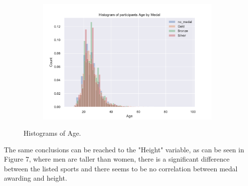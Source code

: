 \documentclass[11pt]{article} %
\begin{document}
\begin{figure}
    \begin{subfigure}{.5\textwidth}
    \includegraphics[scale=0.5]{Age_hist_by_Medal.pdf}
    \end{subfigure}
    \caption{Histograms of Age.}
\end{figure}

The same conclusions can be reached to the "Height" variable, as can be seen in Figure 7, where men are taller than women, there is a significant difference between the listed sports and there seems to be no correlation between medal awarding and height.
\end{document}
